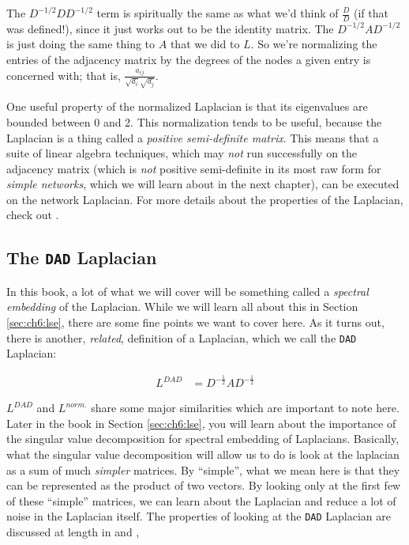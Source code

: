 The $D^{-1/2} D D^{-1/2}$ term is spiritually the same as what we'd think of $\frac{D}{D}$ (if that was defined!), since it just works out to be the identity matrix. The $D^{-1/2} A D^{-1/2}$ is just doing the same thing to $A$ that we did to $L$. So we're normalizing the entries of the adjacency matrix by the degrees of the nodes a given entry is concerned with; that is, $\frac{a_{ij}}{\sqrt{d_i}\sqrt{d_j}}$.

One useful property of the normalized Laplacian is that its eigenvalues are bounded between 0 and 2. This normalization tends to be useful, because the Laplacian is a thing called a \emph{positive semi-definite matrix}. This means that a suite of linear algebra techniques, which may \emph{not} run successfully on the adjacency matrix (which is \emph{not} positive semi-definite in its most raw form for \emph{simple networks}, which we will learn about in the next chapter), can be executed on the network Laplacian. For more details about the properties of the Laplacian, check out \cite{Li2014Dec}.

\subsection{The \texttt{DAD} Laplacian}
\label{sec:ch4:mtx-rep:dad_laplacian}

In this book, a lot of what we will cover will be something called a \emph{spectral embedding} of the Laplacian. While we will learn all about this in Section \ref{sec:ch6:lse}, there are some fine points we want to cover here. As it turns out, there is another, \emph{related}, definition of a Laplacian, which we call the \texttt{DAD} Laplacian:

\begin{align*}
    L^{DAD} &= D^{-\frac{1}{2}}A D^{-\frac{1}{2}}
\end{align*}

$L^{DAD}$ and $L^{norm.}$ share some major similarities which are important to note here. Later in the book in Section \ref{sec:ch6:lse}, you will learn about the importance of the singular value decomposition for spectral embedding of Laplacians. Basically, what the singular value decomposition will allow us to do is look at the laplacian as a sum of much \emph{simpler} matrices. By ``simple'', what we mean here is that they can be represented as the product of two vectors. By looking only at the first few of these ``simple'' matrices, we can learn about the Laplacian and reduce a lot of noise in the Laplacian itself. The properties of looking at the \texttt{DAD} Laplacian are discussed at length in \cite{Chaudhuri2012Jun} and \cite{Amini2012Jul},


